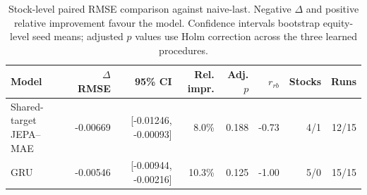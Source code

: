 \begin{table}[t]
\centering
\small
\caption{Stock-level paired RMSE comparison against naive-last. Negative $\Delta$ and positive relative improvement favour the model. Confidence intervals bootstrap equity-level seed means; adjusted $p$ values use Holm correction across the three learned procedures.}
\label{tab:paired_rmse_naive}
\begin{tabular}{lrrrrrrr}
\toprule
Model & $\Delta$RMSE & 95\% CI & Rel. impr. & Adj. $p$ & $r_{rb}$ & Stocks & Runs \\
\midrule
Shared-target JEPA--MAE & -0.00669 & [-0.01246, -0.00093] & 8.0\% & 0.188 & -0.73 & 4/1 & 12/15 \\
GRU & -0.00546 & [-0.00944, -0.00216] & 10.3\% & 0.125 & -1.00 & 5/0 & 15/15 \\
\bottomrule
\end{tabular}
\end{table}
